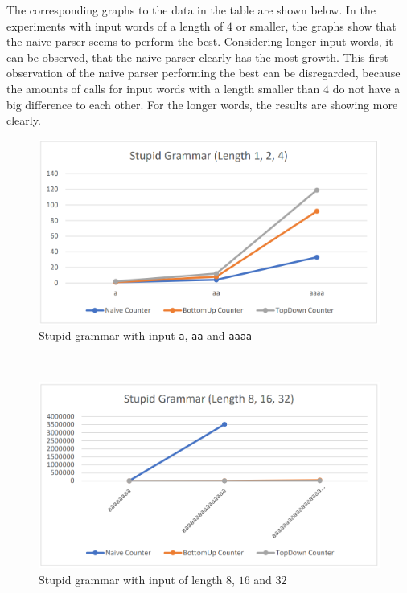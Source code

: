 \documentclass[a4paper, 11pt]{article}
\begin{document}
The corresponding graphs to the data in the table are shown below. In the experiments with input words of a length of $4$ or smaller, the graphs show that the naive parser seems to perform the best. Considering longer input words, it can be observed, that the naive parser clearly has the most growth. This first observation of the naive parser performing the best can be disregarded, because the amounts of calls for input words with a length smaller than $4$ do not have a big difference to each other. For the longer words, the results are showing more clearly.


\begin{minipage}{0.45\textwidth}

\begin{figure}[H]
\begin{center}
\includegraphics[scale=0.28]{diagrams/SG_1.png}
\end{center}
\caption{Stupid grammar with input \texttt{a}, \texttt{aa} and \texttt{aaaa}}
\end{figure}

\end{minipage}\begin{minipage}{0.1\textwidth}
\ 
\end{minipage}\begin{minipage}{0.45\textwidth}

\begin{figure}[H]
\begin{center}
\includegraphics[scale=0.28]{diagrams/SG_2.png}
\end{center}
\caption{Stupid grammar with input of length $8$, $16$ and $32$}
\end{figure}

\end{minipage}
\end{document}
